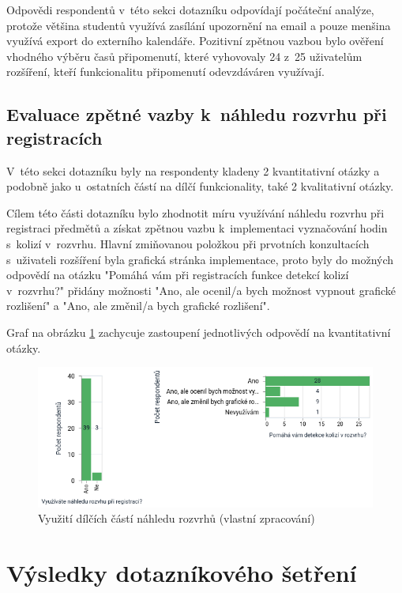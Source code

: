 Odpovědi respondentů v~této sekci dotazníku odpovídají počáteční analýze, protože většina studentů využívá zasílání upozornění na email a pouze menšina využívá export do externího kalendáře. Pozitivní zpětnou vazbou bylo ověření vhodného výběru časů připomenutí, které vyhovovaly 24 z~25 uživatelům rozšíření, kteří funkcionalitu připomenutí odevzdáváren využívají.

\subsection{Evaluace zpětné vazby k~náhledu rozvrhu při registracích}

V~této sekci dotazníku byly na respondenty kladeny 2 kvantitativní otázky a podobně jako u~ostatních částí na dílčí funkcionality, také 2 kvalitativní otázky.

Cílem této části dotazníku bylo zhodnotit míru využívání náhledu rozvrhu při registraci předmětů a získat zpětnou vazbu k~implementaci vyznačování hodin s~kolizí v~rozvrhu. Hlavní zmiňovanou položkou při prvotních konzultacích s~uživateli rozšíření byla grafická stránka implementace, proto byly do možných odpovědí na otázku "Pomáhá vám při registracích funkce detekcí kolizí v~rozvrhu?" přidány možnosti "Ano, ale ocenil/a bych možnost vypnout grafické rozlišení" a "Ano, ale změnil/a bych grafické rozlišení".    

Graf na obrázku \ref{fig:nahledy-vizualizace} zachycuje zastoupení jednotlivých odpovědí na kvantitativní otázky.

\begin{figure}[htbp!]\centering
    \includegraphics[width=\textwidth]{img/previews-visualization.png}
    \caption{Využití dílčích částí náhledu rozvrhů (vlastní zpracování)}
    \label{fig:nahledy-vizualizace}
\end{figure}

\section{Výsledky dotazníkového šetření}


